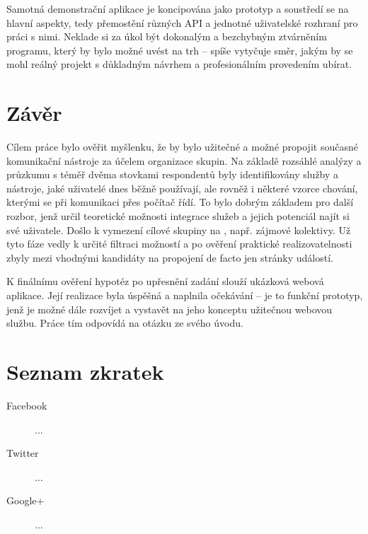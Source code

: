 \documentclass[12pt,oneside,final]{fithesis2}
\begin{document}
Samotná demonstrační aplikace je koncipována jako prototyp a soustředí se na hlavní aspekty, tedy přemostění různých API a jednotné uživatelské rozhraní pro práci s nimi. Neklade si za úkol být dokonalým a bezchybným ztvárněním programu, který by bylo možné uvést na trh -- spíše vytyčuje směr, jakým by se mohl reálný projekt s důkladným návrhem a profesionálním provedením ubírat.



\chapter{Závěr}
Cílem práce bylo ověřit myšlenku, že by bylo užitečné a možné propojit současné komunikační nástroje za účelem organizace skupin. Na základě rozsáhlé analýzy a průzkumu s téměř dvěma stovkami respondentů byly identifikovány služby a nástroje, jaké uživatelé dnes běžně používají, ale rovněž i některé vzorce chování, kterými se při komunikaci přes počítač řídí. To bylo dobrým základem pro další rozbor, jenž určil teoretické možnosti integrace služeb a jejich potenciál najít si své uživatele. Došlo k vymezení cílové skupiny na , např. zájmové kolektivy. Už tyto fáze vedly k určité filtraci možností a po ověření praktické realizovatelnosti zbyly mezi vhodnými kandidáty na propojení de facto jen stránky událostí.

K finálnímu ověření hypotéz po upřesnění zadání slouží ukázková webová aplikace. Její realizace byla úspěšná a naplnila očekávání -- je to funkční prototyp, jenž je možné dále rozvíjet a vystavět na jeho konceptu užitečnou webovou službu. Práce tím odpovídá na otázku ze svého úvodu.




\begin{flushleft}
\end{flushleft}



\appendix
\chapter{Seznam zkratek}\label{abbrs}

\begin{description}
    \item[Facebook] ...
    \item[Twitter] ...
    \item[Google+] ...
\end{description}
\end{document}

